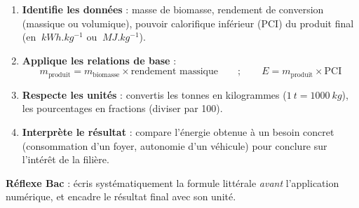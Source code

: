 \documentclass[11pt]{article}
\begin{document}
\begin{methode}
\begin{enumerate}
\item \textbf{Identifie les données} : masse de biomasse, rendement de conversion (massique ou volumique), pouvoir calorifique inférieur (PCI) du produit final (en $\SI{}{kWh.kg^{-1}}$ ou $\SI{}{MJ.kg^{-1}}$).
\item \textbf{Applique les relations de base} :
\[ m_{\text{produit}} = m_{\text{biomasse}} \times \text{rendement massique} \qquad ; \qquad E = m_{\text{produit}} \times \text{PCI} \]
\item \textbf{Respecte les unités} : convertis les tonnes en kilogrammes ($\SI{1}{t} = \SI{1000}{kg}$), les pourcentages en fractions (diviser par 100).
\item \textbf{Interprète le résultat} : compare l'énergie obtenue à un besoin concret (consommation d'un foyer, autonomie d'un véhicule) pour conclure sur l'intérêt de la filière.
\end{enumerate}
\textbf{Réflexe Bac} : écris systématiquement la formule littérale \emph{avant} l'application numérique, et encadre le résultat final avec son unité.
\end{methode}
\end{document}
